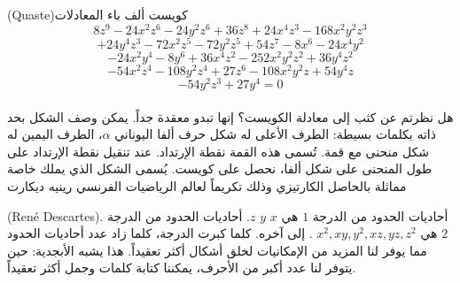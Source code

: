 \begin{surferPage}{(Quaste)كويست}
ألف باء المعادلات
  \smallskip
\[8z^9-24x^2z^6-24y^2z^6+36z^8+24x^4z^3-168x^2y^2z^3\]
\[+24y^4z^3-72x^2z^5-72y^2z^5+54z^7-8x^6-24x^4y^2\]
\[-24x^2y^4-8y^6 + 36x^4z^2-252x^2y^2z^2+36y^4z^2\]
\[- 54x^2z^4-108y^2z^4 + 27z^6-108x^2y^2z + 54y^4z\]
\[-54y^2z^3 + 27y^4 = 0\]\\
\vspace{0.3cm}
هل نظرتم عن كثب إلى معادلة الكويست؟ إنها تبدو معقدة جداً.
يمكن وصف الشكل بحد ذاته بكلمات بسيطة: الطرف الأعلى له شكل حرف ألفا اليوناني $\alpha$، الطرف اليمين له شكل منحنى مع قمة. تُسمى هذه القمة نقطة الإرتداد. عند تنقيل نقطة الإرتداد على طول المنحنى على شكل ألفا، نحصل على كويست. يُسمى الشكل الذي يملك خاصة مماثلة  بالحاصل الكارتيزي وذلك تكريماً لعالم الرياضيات الفرنسي رينيه ديكارت

\textenglish{(Ren\'e Descartes)}.
\vspace{0.3cm}
أحاديات الحدود من الدرجة $1$ هي $x$ $y$  $z$. أحاديات الحدود من الدرجة $2$ هي
 $x^2, xy, y^2, xz, yz, z^2$  
. إلى آخره. كلما كبرت الدرجة، كلما زاد عدد أحاديات الحدود مما يوفر لنا المزيد من الإمكانيات لخلق أشكال أكثر تعقيداً. هذا يشبه الأبجدية: حين يتوفر لنا عدد أكبر من الأحرف، يمكننا كتابة كلمات وجمل أكثر تعقيداً.
\end{surferPage}
